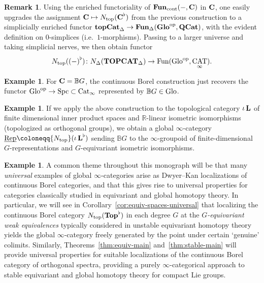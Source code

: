 \documentclass[reqno]{memo-l}
\theoremstyle{mythm}
\theoremstyle{definition}
\newtheorem{rk}[thm]{Remark}
\newtheorem{ex}[thm]{Example}
\numberwithin{equation}{section}
\newcommand{\R} {{\mathbb{R}}}
\DeclareMathOperator{\Spc}{Spc}
\DeclareMathOperator{\Cat}{Cat}
\DeclareMathOperator{\CAT}{CAT}
\newcommand{\Fun}{{\textup{Fun}}}
\newcommand{\Ntop}{{N_\textup{top}}}
\newcommand{\cat}[1]{\textbf{\textup{#1}}}
\newcommand{\op}{{\textup{op}}}
\DeclareMathOperator{\core}{\iota}
\newcommand{\dual}{\flat}
\newcommand{\Glo}{\textup{Glo}}
\newcommand{\BGcat}[1]{\mathbb B{#1}}
\newcommand{\ulhelper}[2]{\underline{\setbox0=\hbox{$#1#2$}\dp0=0.4pt \box0\relax}}
\newcommand{\ul}[1]{{\mathpalette\ulhelper{#1}}\hbox{\rule[-2pt]{0pt}{0pt}}}
\newcommand{\Vect}{\textup{Rep}}
\newcommand{\Borcat}[1]{N_{\textup{top}}({#1}^{\dual})}
\begin{document}
\begin{rk}
    Using the enriched functoriality of $\cat{Fun}_\text{cont}(-,\cat{C})$ in $\cat{C}$, one easily upgrades the assignment $\cat{C}\mapsto\Ntop(\cat{C}^\dual)$ from the previous construction to a simplicially enriched functor $\cat{topCat}_\Delta\to\cat{Fun}_\Delta(\cat{Glo}^\op,\cat{QCat})$, with the evident definition on $0$-simplices (i.e.\ $1$-morphisms). Passing to a larger universe and taking simplicial nerves, we then obtain functor 
    \begin{equation}\label{eq:Borcat}
        \Borcat{(-)}\colon N_\Delta(\cat{TOPCAT}_\Delta)\to\Fun(\Glo^\op,\CAT_\infty).
    \end{equation}
\end{rk}

\begin{ex}
    For $\cat{C}=\BGcat{G}$, the continuous Borel construction just recovers the functor $\Glo^\op\to\Spc\subset\Cat_\infty$ represented by $\BGcat{G}\in\Glo$.
\end{ex}

\begin{ex}
    If we apply the above construction to the topological category $\core\cat{L}$ of finite dimensional inner product spaces and $\R$-linear isometric isomorphisms (topologized as orthogonal groups), we obtain a global $\infty$-category $\ul\Vect\coloneqq\Ntop(\core\cat{L}^\dual)$ sending $\BGcat{G}$ to the $\infty$-groupoid of finite-dimensional $G$-representations and $G$-equivariant isometric isomorphisms.
\end{ex}

\begin{ex}
    A common theme throughout this monograph will be that many \emph{universal} examples of global $\infty$-categories arise as Dwyer--Kan localizations of continuous Borel categories, and that this gives rise to universal properties for categories classically studied in equivariant and global homotopy theory. In particular, we will see in Corollary~\ref{cor:equiv-spaces-universal} that localizing the continuous Borel category $\Ntop(\cat{Top}^\flat)$ in each degree $G$ at the \emph{$G$-equivariant weak equivalences} typically considered in unstable equivariant homotopy theory yields the global $\infty$-category freely generated by the point under certain `genuine' colimits. Similarly, Theorems~\ref{thm:equiv-main} and~\ref{thm:stable-main} will provide universal properties for suitable localizations of the continuous Borel category of {orthogonal spectra}, providing a purely $\infty$-categorical approach to stable equivariant and global homotopy theory for compact Lie groups.
\end{ex}
\end{document}
